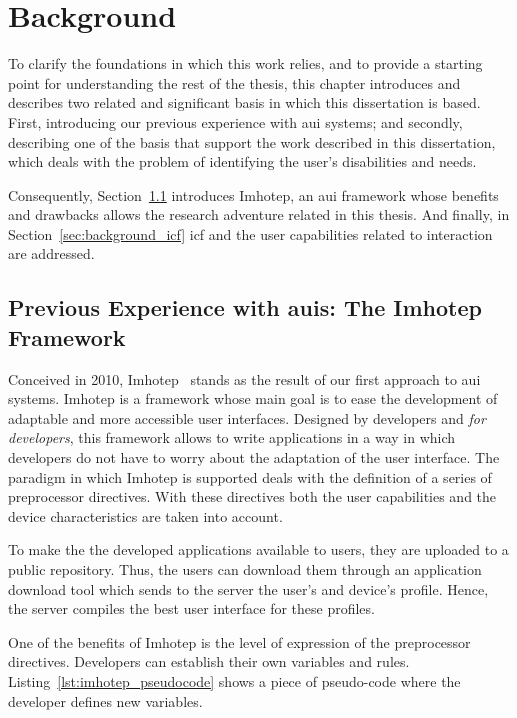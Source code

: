 \section{Background}
\label{sec:background}

To clarify the foundations in which this work relies, and to provide a starting 
point for understanding the rest of the thesis, this chapter introduces and 
describes two related and significant basis in which this dissertation is based. 
First, introducing our previous experience with \ac{aui} systems; and secondly, 
describing one of the basis that support the work described in this dissertation, 
which deals with the problem of identifying the user's disabilities and needs.

Consequently, Section~\ref{sec:background_imhotep} introduces Imhotep, an \ac{aui}
framework whose benefits and drawbacks allows the research adventure related
in this thesis. And finally, in Section~\ref{sec:background_icf} \ac{icf} and
the user capabilities related to interaction are addressed.

\subsection{Previous Experience with \acp{aui}: The Imhotep Framework}
\label{sec:background_imhotep}

Conceived in 2010, Imhotep~\citep{almeida_imhotep_2011} stands as the result of 
our first approach to \ac{aui} systems. Imhotep is a framework whose main goal
is to ease the development of adaptable and more accessible user interfaces. 
Designed by developers and \textit{for developers}, this framework allows to 
write applications in a way in which developers do not have to worry about the 
adaptation of the user interface. The paradigm in which Imhotep is supported 
deals with the definition of a series of preprocessor directives. With these 
directives both the user capabilities and the device characteristics are taken
into account. 

To make the the developed applications available to users, they are uploaded to 
a public repository. Thus, the users can download them through an application 
download tool which sends to the server the user's and device's profile. Hence, 
the server compiles the best user interface for these profiles.

One of the benefits of Imhotep is the level of expression of the preprocessor
directives. Developers can establish their own variables and rules.
Listing~\ref{lst:imhotep_pseudocode} shows a piece of pseudo-code where the
developer defines new variables.

